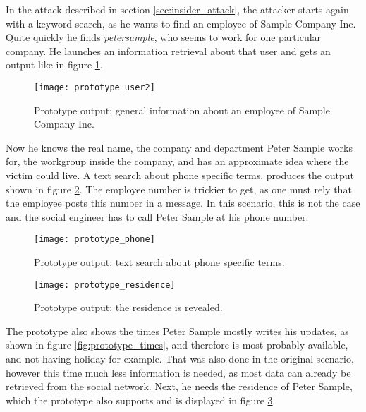In the attack described in section \ref{sec:insider_attack}, the attacker
starts again with a keyword search, as he wants to find an employee of Sample
Company Inc. Quite quickly he finds \textit{petersample}, who seems to work for
one particular company. He launches an information retrieval about that user
and gets an output like in figure \ref{fig:prototype_user2}.

\begin{figure}[htb]
  \begin{center}
    \texttt{[image: prototype\_user2]}
    \caption{Prototype output: general information about an employee of Sample
    Company Inc.}
    \label{fig:prototype_user2}
  \end{center}
\end{figure}

Now he knows the real name, the company and department Peter Sample works for,
the workgroup inside the company, and has an approximate idea where the victim
could live. A text search about phone specific terms, produces the output
shown in figure \ref{fig:prototype_phone}. The employee number is
trickier to get, as one must rely that the employee posts this number in a
message. In this scenario, this is not the case and the social engineer has to
call Peter Sample at his phone number.

\begin{figure}[htb]
  \begin{center}
    \texttt{[image: prototype\_phone]}
    \caption{Prototype output: text search about phone specific terms.}
    \label{fig:prototype_phone}
  \end{center}
\end{figure}


\begin{figure}[htb]
  \begin{center}
    \texttt{[image: prototype\_residence]}
    \caption{Prototype output: the residence is revealed.}
    \label{fig:prototype_residence}
  \end{center}
\end{figure}

The prototype also shows the times Peter Sample mostly writes his updates, as
shown in figure \ref{fig:prototype_times}, and therefore is most probably
available, and not having holiday for example. That was also done in the
original scenario, however this time much less information is needed, as most
data can already be retrieved from the social network. Next, he needs the residence
of Peter Sample, which the prototype also supports and is displayed in figure
\ref{fig:prototype_residence}.

